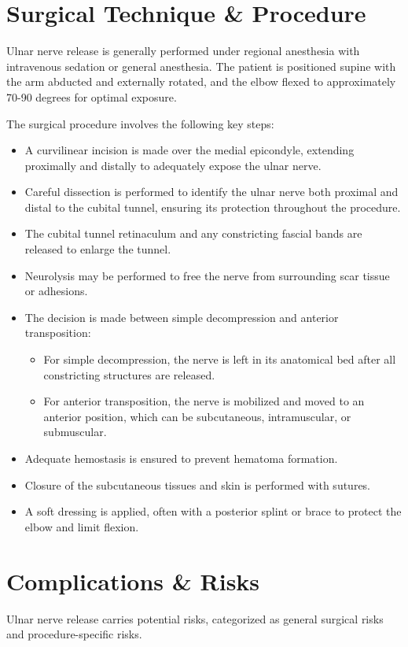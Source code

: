 \section*{Surgical Technique \& Procedure}
Ulnar nerve release is generally performed under regional anesthesia with intravenous sedation or general anesthesia. The patient is positioned supine with the arm abducted and externally rotated, and the elbow flexed to approximately 70-90 degrees for optimal exposure.

The surgical procedure involves the following key steps:

\begin{itemize}
  \item A curvilinear incision is made over the medial epicondyle, extending proximally and distally to adequately expose the ulnar nerve.
  \item Careful dissection is performed to identify the ulnar nerve both proximal and distal to the cubital tunnel, ensuring its protection throughout the procedure.
  \item The cubital tunnel retinaculum and any constricting fascial bands are released to enlarge the tunnel.
  \item Neurolysis may be performed to free the nerve from surrounding scar tissue or adhesions.
  \item The decision is made between simple decompression and anterior transposition:
    \begin{itemize}
      \item For simple decompression, the nerve is left in its anatomical bed after all constricting structures are released.
      \item For anterior transposition, the nerve is mobilized and moved to an anterior position, which can be subcutaneous, intramuscular, or submuscular.
    \end{itemize}
  \item Adequate hemostasis is ensured to prevent hematoma formation.
  \item Closure of the subcutaneous tissues and skin is performed with sutures.
  \item A soft dressing is applied, often with a posterior splint or brace to protect the elbow and limit flexion.
\end{itemize}

\section*{Complications \& Risks}
Ulnar nerve release carries potential risks, categorized as general surgical risks and procedure-specific risks.

